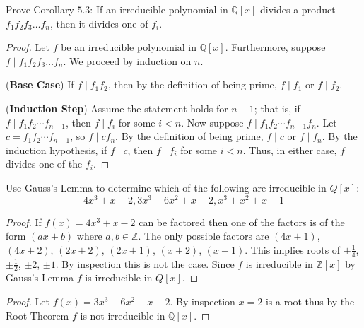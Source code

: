 \begin{tcolorbox}[title=Problem 3, breakable]
    Prove Corollary $5.3$: If an irreducible polynomial
    in $\mathbb{Q}[x]$ divides a product $f_1 f_2 f_3 \ldots f_n$,
    then it divides one of $f_i$.
\end{tcolorbox}

\begin{proof}
    Let $f$ be an irreducible polynomial in $\mathbb{Q}[x]$.
    Furthermore, suppose $f \mid f_1 f_2 f_3 \ldots f_n$.
    We proceed by induction on $n$.

    (\textbf{Base Case})  
    If $f \mid f_1 f_2$, then by the definition of being prime, 
    $f \mid f_1$ or $f \mid f_2$.

    (\textbf{Induction Step})  
    Assume the statement holds for $n - 1$; that is, 
    if $f \mid f_1 f_2 \cdots f_{n-1}$, then $f \mid f_i$ for some $i < n$.  
    Now suppose $f \mid f_1 f_2 \cdots f_{n-1} f_n$.  
    Let $c = f_1 f_2 \cdots f_{n-1}$, so $f \mid c f_n$.  
    By the definition of being prime, $f \mid c$ or $f \mid f_n$.  
    By the induction hypothesis, if $f \mid c$, then $f \mid f_i$ for some $i < n$.  
    Thus, in either case, $f$ divides one of the $f_i$.
\end{proof}

\begin{tcolorbox}[title=Problem 4, breakable]
    Use Gauss's Lemma to determine which of the following 
    are irreducible in $Q[x]$:
    \[4x^3 + x - 2, 3x^3 - 6x^2 + x - 2, x^3 + x^2 + x - 1\]
\end{tcolorbox}

\begin{proof}
    If $f(x) = 4x^3 + x - 2$ can be factored then one of 
        the factors is of the form $(ax + b)$
        where $a, b \in \mathbb{Z}$.
    The only possible factors are 
        $(4x \pm 1)$, $(4x \pm 2)$, $(2x \pm 2)$, $(2x \pm 1)$, $(x \pm 2)$, $(x \pm 1)$.
    This implies roots of $\pm \frac{1}{4}$, $\pm \frac{1}{2}$, $\pm 2$, $\pm 1$.
    By inspection this is not the case.
    Since $f$ is irreducible in $\mathbb{Z}[x]$ by Gauss's Lemma $f$ is irreducible in $Q[x]$.
\end{proof}

\begin{proof}
    Let $f(x) =  3x^3 - 6x^2 + x - 2$.
    By inspection $x = 2$ is a root thus by the Root Theorem 
        $f$ is not irreducible in $\mathbb{Q}[x]$.
\end{proof}

